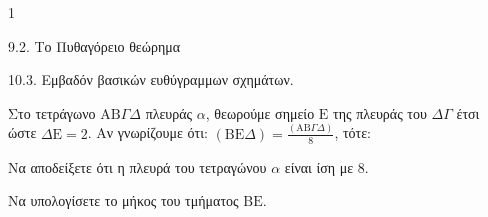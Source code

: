 \begin{ylh}{1}
    \item 9.2. Το Πυθαγόρειο θεώρημα
    \item 10.3. Εμβαδόν βασικών ευθύγραμμων σχημάτων.
\end{ylh}
\begin{figure}
\end{figure}
Στο τετράγωνο $\mathrm{AB}\Gamma\Delta$ πλευράς $\alpha$, θεωρούμε σημείο $\mathrm{E}$ της πλευράς του $\Delta\Gamma$ έτσι ώστε $\Delta\mathrm{E} = 2$. Αν γνωρίζουμε ότι: $(\text{BE}\Delta) = \frac{(\text{AB}\Gamma\Delta)}{8}$, τότε:
\begin{alist}
    \item Να αποδείξετε ότι η πλευρά του τετραγώνου $\alpha$ είναι ίση με 8. 
    \item Να υπολογίσετε το μήκος του τμήματος $\mathrm{BE}$. 
\end{alist}